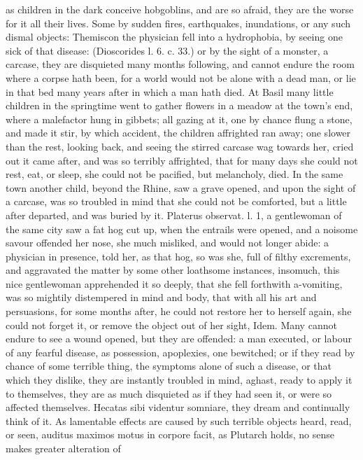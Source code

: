 {{as children in the dark conceive hobgoblins, and are so afraid, they
are the worse for it all their lives. Some by sudden fires,
earthquakes, inundations, or any such dismal objects: Themiscon the
physician fell into a hydrophobia, by seeing one sick of that disease:
(Dioscorides l. 6. c. 33.) or by the sight of a monster, a carcase,
they are disquieted many months following, and cannot endure the room
where a corpse hath been, for a world would not be alone with a dead
man, or lie in that bed many years after in which a man hath died. At
Basil many little children in the springtime went to gather
flowers in a meadow at the town's end, where a malefactor hung in
gibbets; all gazing at it, one by chance flung a stone, and made it
stir, by which accident, the children affrighted ran away; one slower
than the rest, looking back, and seeing the stirred carcase wag towards
her, cried out it came after, and was so terribly affrighted, that for
many days she could not rest, eat, or sleep, she could not be pacified,
but melancholy, died. In the same town another child, beyond the
Rhine, saw a grave opened, and upon the sight of a carcase, was so
troubled in mind that she could not be comforted, but a little after
departed, and was buried by it. Platerus observat. l. 1, a gentlewoman
of the same city saw a fat hog cut up, when the entrails were opened,
and a noisome savour offended her nose, she much misliked, and would
not longer abide: a physician in presence, told her, as that hog, so
was she, full of filthy excrements, and aggravated the matter by some
other loathsome instances, insomuch, this nice gentlewoman apprehended
it so deeply, that she fell forthwith a-vomiting, was so mightily
distempered in mind and body, that with all his art and persuasions,
for some months after, he could not restore her to herself again, she
could not forget it, or remove the object out of her sight, Idem. Many
cannot endure to see a wound opened, but they are offended: a man
executed, or labour of any fearful disease, as possession, apoplexies,
one bewitched; or if they read by chance of some terrible thing,
the symptoms alone of such a disease, or that which they dislike, they
are instantly troubled in mind, aghast, ready to apply it to
themselves, they are as much disquieted as if they had seen it, or were
so affected themselves. Hecatas sibi videntur somniare, they dream and
continually think of it. As lamentable effects are caused by such
terrible objects heard, read, or seen, auditus maximos motus in corpore
facit, as Plutarch holds, no sense makes greater alteration of
}}
